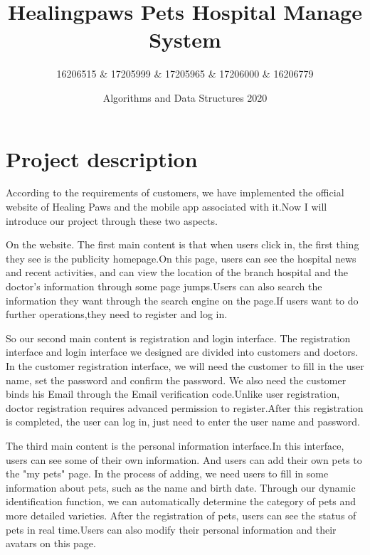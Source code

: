 \documentclass[a4paper]{article}
\begin{document}
\title{Healingpaws Pets Hospital Manage System}
\author{16206515 \& 17205999 \& 17205965 \& 17206000 \& 16206779}
\date{Algorithms and Data Structures 2020}

\maketitle



\section{Project description}

According to the requirements of customers, we have implemented the official website of Healing Paws and the mobile app associated with it.Now I will introduce our project through these two aspects.

On the website. The first main content is that when users click in, the first thing they see is the publicity homepage.On this page, users can see the hospital news and recent activities, and can view the location of the branch hospital and the doctor's information through some page jumps.Users can also search the information they want through the search engine on the page.If users want to do further operations,they need to register and log in.

So our second main content is registration and login interface. The registration interface and login interface we designed are divided into customers and doctors. In the customer registration interface, we will need the customer to fill in the user name, set the password and confirm the password. We also need the customer binds his Email through the Email verification code.Unlike user registration, doctor registration requires advanced permission to register.After this registration is completed, the user can log in, just need to enter the user name and password. 

The third main content is the personal information interface.In this interface, users can see some of their own information. And users can add their own pets to the "my pets" page. In the process of adding, we need users to fill in some information about pets, such as the name and birth date. Through our dynamic identification function, we can automatically determine the category of pets and more detailed varieties. After the registration of pets, users can see the status of pets in real time.Users can also modify their personal information and their avatars on this page.
\end{document}
